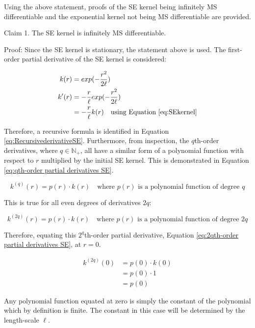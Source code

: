 \documentclass[12pt,a4paper]{article}
\begin{document}
Using the above statement, proofs of the SE kernel being infinitely MS differentiable and the exponential kernel not being MS differentiable are provided.

Claim 1. The SE kernel is infinitely  MS differentiable.

Proof: Since the SE kernel is stationary, the statement above is used. The first-order partial derivative of the SE kernel is considered:

\begin{align}
k(r) &= exp(-\frac{r^2}{2\ell}) \label{eq:SEkernel} \\
k'(r) &= -\frac{r}{\ell} exp(-\frac{r^2}{2\ell}) \nonumber \\
&= -\frac{r}{\ell} k(r) \quad \text{using Equation \eqref{eq:SEkernel}} \label{eq:RecursivederivativeSE}
\end{align}

Therefore, a recursive formula is identified in Equation \eqref{eq:RecursivederivativeSE}. Furthermore, from inspection, the \(q\)th-order derivatives, where \(q \in \mathbb{N}_{+}\), all have a similar form of a polynomial function with respect to \(r\) multiplied by the initial SE kernel. This is demonstrated in Equation \eqref{eq:qth-order partial derivatives SE}.

\begin{equation}
k^{(q)}(r) = p(r) \cdot k(r) \quad \text{where } p(r) \text{ is a polynomial function of degree } q
\label{eq:qth-order partial derivatives SE}
\end{equation}

This is true for all even degrees of derivatives \(2q\):

\begin{equation}
k^{(2q)}(r) = p(r) \cdot k(r) \quad \text{where } p(r) \text{ is a polynomial function of degree } 2q
\label{eq:2qth-order partial derivatives SE}
\end{equation}

Therefore, equating this \(2^q\)th-order partial derivative, Equation \eqref{eq:2qth-order partial derivatives SE}, at \(r = 0\).

\begin{align*}
k^{(2q)}(0) &= p(0) \cdot k(0) \\
&= p(0) \cdot 1 \\
&= p(0)
\end{align*}

Any polynomial function equated at zero is simply the constant of the polynomial which by definition is finite. The constant in this case will be determined by the length-scale \(\ell\).
\end{document}
